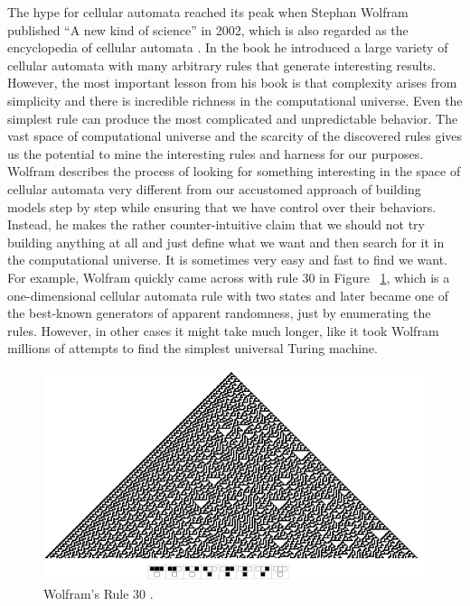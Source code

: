 \documentclass[12pt]{article}
\numberwithin{figure}{section} %
\begin{document}
The hype for cellular automata reached its peak when Stephan Wolfram published “A new kind of science” in 2002, which is also regarded as the encyclopedia of cellular automata \cite{A new kind of Science}. In the book he introduced a large variety of cellular automata with many arbitrary rules that generate interesting results. However, the most important lesson from his book is that complexity arises from simplicity and there is incredible richness in the computational universe. Even the simplest rule can produce the most complicated and unpredictable behavior. The vast space of computational universe and the scarcity of the discovered rules gives us the potential to mine the interesting rules and harness for our purposes. Wolfram describes the process of looking for something interesting in the space of cellular automata very different from our accustomed approach of building models step by step while ensuring that we have control over their behaviors. Instead, he makes the rather counter-intuitive claim that we should not try building anything at all and just define what we want and then search for it in the computational universe. It is sometimes very easy and fast to find we want. For example, Wolfram quickly came across with rule 30 \cite{Rule 30} in Figure ~\ref{fig:Rule 30}, which is a one-dimensional cellular automata rule with two states and later became one of the best-known generators of apparent randomness, just by enumerating the rules. However, in other cases it might take much longer, like it took Wolfram millions of attempts to find the simplest universal Turing machine. 
 
\begin{figure}[H]
\includegraphics[width=\linewidth]{Section2/1}
\caption[Wolfram's Rule 30]{Wolfram’s Rule 30 \cite{Rule 30}.}
\vspace{-1.5em}
\label{fig:Rule 30}
\end{figure}
\end{document}
